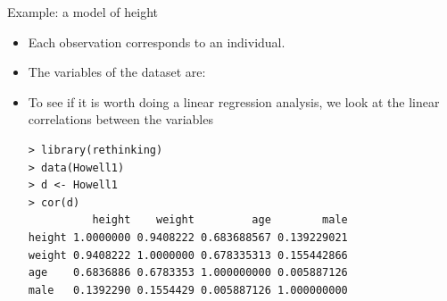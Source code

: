 \documentclass[handout]{beamer}
\begin{document}
\begin{frame}[fragile]{Example: a model of height}
\scriptsize{
\begin{itemize}
 \item Each observation corresponds to an individual.
 \item The variables of the dataset are:
 
\item To see if it is worth doing a linear regression analysis, we look at the linear correlations between the variables

 \begin{verbatim}
> library(rethinking)
> data(Howell1)
> d <- Howell1
> cor(d)
          height    weight         age        male
height 1.0000000 0.9408222 0.683688567 0.139229021
weight 0.9408222 1.0000000 0.678335313 0.155442866
age    0.6836886 0.6783353 1.000000000 0.005887126
male   0.1392290 0.1554429 0.005887126 1.000000000
 \end{verbatim}

 
 
 
\end{itemize}
 
 
 
 
} 
\end{frame}
\end{document}
